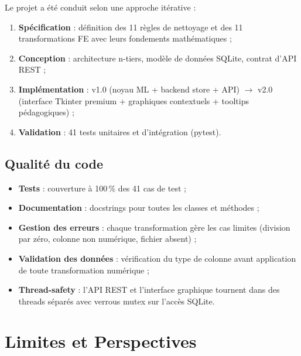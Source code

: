 \documentclass[12pt,a4paper]{article}
\begin{document}
Le projet a été conduit selon une approche itérative :

\begin{enumerate}[leftmargin=1.5em]
  \item \textbf{Spécification} : définition des 11 règles de nettoyage et des
    11 transformations FE avec leurs fondements mathématiques ;
  \item \textbf{Conception} : architecture n-tiers, modèle de données SQLite,
    contrat d'API REST ;
  \item \textbf{Implémentation} :
    v1.0 (noyau ML + backend store + API) $\to$ v2.0 (interface Tkinter premium
    + graphiques contextuels + tooltips pédagogiques) ;
  \item \textbf{Validation} : 41 tests unitaires et d'intégration (pytest).
\end{enumerate}

\subsection{Qualité du code}

\begin{itemize}[leftmargin=1.5em]
  \item \textbf{Tests} : couverture à 100\,\% des 41 cas de test ;
  \item \textbf{Documentation} : docstrings pour toutes les classes et méthodes ;
  \item \textbf{Gestion des erreurs} : chaque transformation gère les cas
    limites (division par zéro, colonne non numérique, fichier absent) ;
  \item \textbf{Validation des données} : vérification du type de colonne avant
    application de toute transformation numérique ;
  \item \textbf{Thread-safety} : l'API REST et l'interface graphique tournent
    dans des threads séparés avec verrous mutex sur l'accès SQLite.
\end{itemize}

\section{Limites et Perspectives}
\end{document}
